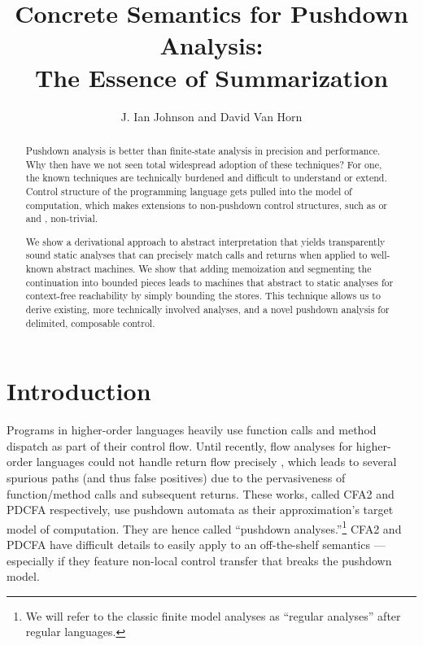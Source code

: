 \documentclass{llncs}
\title{Concrete Semantics for Pushdown Analysis:\\The Essence of Summarization}
\author{J. Ian Johnson and David Van Horn}
\institute{Northeastern University \\
           \email{\{ianj,dvanhorn\}@ccs.neu.edu}}
\newcommand{\Scribtexttt}[1]{{\texttt{#1}}}
\newcommand{\SColorize}[2]{\color{#1}{#2}}
\newcommand{\inColor}[2]{{\Scribtexttt{\SColorize{#1}{#2}}}}
\newcommand{\rackett}[1]{\inColor{black}{#1}}
\begin{document}
\maketitle


\begin{abstract}
Pushdown analysis is better than finite-state analysis in precision and
performance. Why then have we not seen total widespread adoption of these
techniques? For one, the known techniques are technically burdened and
difficult to understand or extend. Control structure of the programming language
gets pulled into the model of computation, which makes extensions to
non-pushdown control structures, such as \rackett{call/cc} or \rackett{shift} and
\rackett{reset}, non-trivial.

We show a derivational approach to abstract interpretation that yields
transparently sound static analyses that can precisely match calls and
returns when applied to well-known abstract machines. We show that
adding memoization and segmenting the continuation into bounded pieces
leads to machines that abstract to static analyses for context-free
reachability by simply bounding the stores. This technique allows us
to derive existing, more technically involved analyses, and a novel
pushdown analysis for delimited, composable control.
\end{abstract}

\section{Introduction}

Programs in higher-order languages heavily use function calls and
method dispatch as part of their control flow. Until recently, flow
analyses for higher-order languages could not handle return flow
precisely \citep{ianjohnson:vardoulakis-lmcs11,
  ianjohnson:earl2010pdcfa}, which leads to several spurious paths
(and thus false positives) due to the pervasiveness of function/method
calls and subsequent returns. These works, called CFA2 and PDCFA
respectively, use pushdown automata as their approximation's target
model of computation. They are hence called ``pushdown
analyses.''\footnote{We will refer to the classic finite model
  analyses as ``regular analyses'' after regular languages.} CFA2 and
PDCFA have difficult details to easily apply to an off-the-shelf
semantics --- especially if they feature non-local control transfer
that breaks the pushdown model.
\end{document}

